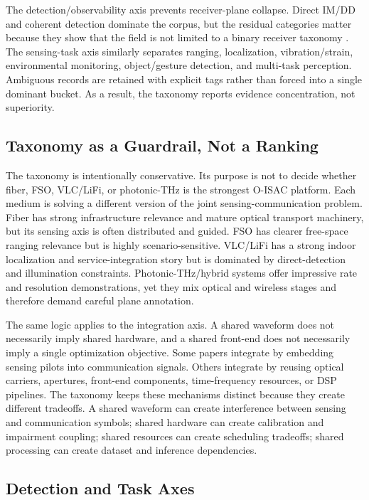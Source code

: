 \documentclass[letterpaper,journal]{IEEEtran}
\begin{document}
The detection/observability axis prevents receiver-plane collapse. Direct IM/DD and coherent detection dominate the corpus, but the residual categories matter because they show that the field is not limited to a binary receiver taxonomy \cite{O_ISAC_001,O_ISAC_028,O_ISAC_029,O_ISAC_122,O_ISAC_136}. The sensing-task axis similarly separates ranging, localization, vibration/strain, environmental monitoring, object/gesture detection, and multi-task perception. Ambiguous records are retained with explicit tags rather than forced into a single dominant bucket. As a result, the taxonomy reports evidence concentration, not superiority.

\subsection{Taxonomy as a Guardrail, Not a Ranking}

The taxonomy is intentionally conservative. Its purpose is not to decide whether fiber, FSO, VLC/LiFi, or photonic-THz is the strongest O-ISAC platform. Each medium is solving a different version of the joint sensing-communication problem. Fiber has strong infrastructure relevance and mature optical transport machinery, but its sensing axis is often distributed and guided. FSO has clearer free-space ranging relevance but is highly scenario-sensitive. VLC/LiFi has a strong indoor localization and service-integration story but is dominated by direct-detection and illumination constraints. Photonic-THz/hybrid systems offer impressive rate and resolution demonstrations, yet they mix optical and wireless stages and therefore demand careful plane annotation.

The same logic applies to the integration axis. A shared waveform does not necessarily imply shared hardware, and a shared front-end does not necessarily imply a single optimization objective. Some papers integrate by embedding sensing pilots into communication signals. Others integrate by reusing optical carriers, apertures, front-end components, time-frequency resources, or DSP pipelines. The taxonomy keeps these mechanisms distinct because they create different tradeoffs. A shared waveform can create interference between sensing and communication symbols; shared hardware can create calibration and impairment coupling; shared resources can create scheduling tradeoffs; shared processing can create dataset and inference dependencies.

\subsection{Detection and Task Axes}
\end{document}
